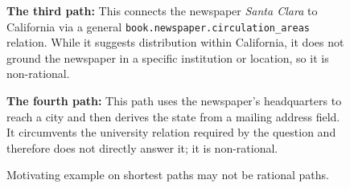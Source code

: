 \begin{figure}[t]
\begin{tcolorbox}[colback=gray!5!white,
                  colframe=gray!75!black,
                  title=WebQTrn-88\_54f1262a1dbcb7b82f5b8ebd614401b9]
{\textbf{The third path:} This connects the newspaper \emph{Santa Clara} to California via a general \texttt{book.newspaper.circulation\_areas} relation. While it suggests distribution within California, it does not ground the newspaper in a specific institution or location, so it is non-rational.\par\vspace{6pt}

\textbf{The fourth path:} This path uses the newspaper's headquarters to reach a city and then derives the state from a mailing address field. It circumvents the university relation required by the question and therefore does not directly answer it; it is non-rational.\par}
\end{tcolorbox}
\caption{Motivating example on shortest paths may not be rational paths.}
\label{fig:type2_no4}
\end{figure}


